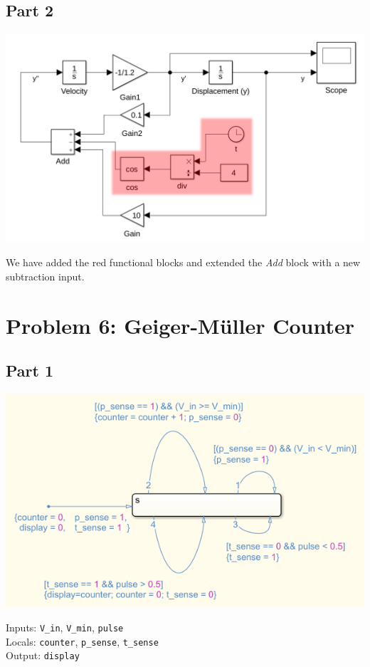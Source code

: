\documentclass[a4paper,parskip,headheight=38pt]{scrartcl} %
\begin{document}
\subsection*{Part 2}

\includegraphics[width=\textwidth]{p5b-model}

We have added the red functional blocks and extended the \emph{Add} block with a new subtraction input.


\section*{Problem 6: Geiger-Müller Counter}

\subsection*{Part 1}

\includegraphics[width=\textwidth]{p6a-model}

Inputs: \texttt{V\_in}, \texttt{V\_min}, \texttt{pulse} \\
Locals: \texttt{counter}, \texttt{p\_sense}, \texttt{t\_sense} \\
Output: \texttt{display}
\end{document}
